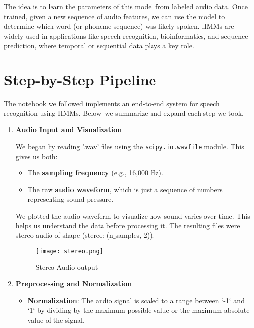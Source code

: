 \documentclass{article}
\begin{document}
    The idea is to learn the parameters of this model from labeled audio data. Once trained, given a new sequence of audio features, we can use the model to determine which word (or phoneme sequence) was likely spoken. HMMs are widely used in applications like speech recognition, bioinformatics, and sequence prediction, where temporal or sequential data plays a key role.
    
\section{Step-by-Step Pipeline}
    
    The notebook we followed implements an end-to-end system for speech recognition using HMMs. Below, we summarize and expand each step we took.
    
\begin{enumerate}
        \item \textbf{Audio Input and Visualization}
        
    We began by reading '.wav' files using the \texttt{scipy.io.wavfile} module. This gives us both:
    \begin{itemize}
        \item The \textbf{sampling frequency} (e.g., 16,000 Hz).
        \item The raw \textbf{audio waveform}, which is just a sequence of numbers representing sound pressure.
    \end{itemize}
    
    We plotted the audio waveform to visualize how sound varies over time. This helps us understand the data before processing it. The resulting files were stereo audio of shape (stereo: (n$\_$samples, 2)).

    \begin{figure}[h!]
        \centering
        \texttt{[image: stereo.png]}
        \caption{Stereo Audio output}
        \label{fig:enter-label}
    \end{figure}
    
    \item \textbf{Preprocessing and Normalization}
    
    \begin{itemize}
    
        \item \textbf{Normalization}: The audio signal is scaled to a range between `-1` and `1` by dividing by the maximum possible value or the maximum absolute value of the signal.
        

\end{itemize}
\end{enumerate}
\end{document}
